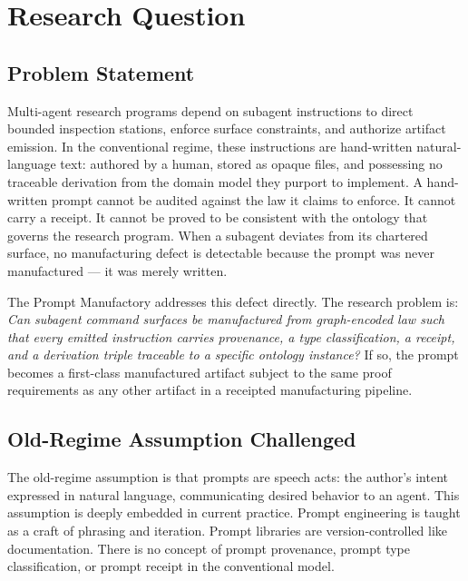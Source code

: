 
\section{Research Question}
\label{sec:research-prompt-manufactory-question}

\subsection{Problem Statement}
\label{sec:research-prompt-manufactory-question-problem}

Multi-agent research programs depend on subagent instructions to direct bounded inspection
stations, enforce surface constraints, and authorize artifact emission. In the conventional
regime, these instructions are hand-written natural-language text: authored by a human,
stored as opaque files, and possessing no traceable derivation from the domain model they
purport to implement. A hand-written prompt cannot be audited against the law it claims to
enforce. It cannot carry a receipt. It cannot be proved to be consistent with the ontology
that governs the research program. When a subagent deviates from its chartered surface, no
manufacturing defect is detectable because the prompt was never manufactured --- it was
merely written.

The Prompt Manufactory addresses this defect directly. The research problem is: \textit{Can
subagent command surfaces be manufactured from graph-encoded law such that every emitted
instruction carries provenance, a type classification, a receipt, and a derivation triple
traceable to a specific ontology instance?} If so, the prompt becomes a first-class
manufactured artifact subject to the same proof requirements as any other artifact in a
receipted manufacturing pipeline.

\subsection{Old-Regime Assumption Challenged}
\label{sec:research-prompt-manufactory-question-old-regime}

The old-regime assumption is that prompts are speech acts: the author's intent expressed
in natural language, communicating desired behavior to an agent. This assumption is deeply
embedded in current practice. Prompt engineering is taught as a craft of phrasing and
iteration. Prompt libraries are version-controlled like documentation. There is no concept
of prompt provenance, prompt type classification, or prompt receipt in the conventional
model.

